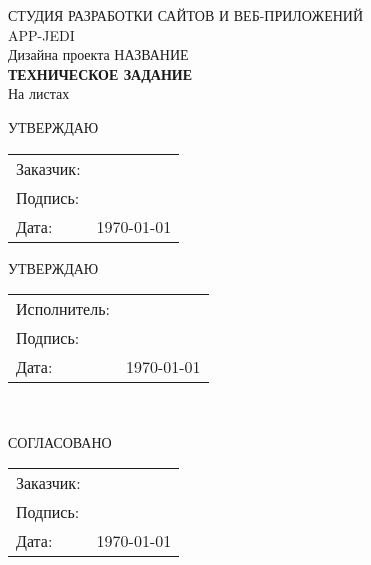 %
\begin{center}
{\Large {{СТУДИЯ РАЗРАБОТКИ САЙТОВ И ВЕБ-ПРИЛОЖЕНИЙ \\ {\LARGE APP-JEDI}}}}\\[4cm]

{\huge Дизайна проекта {\LARGE НАЗВАНИЕ}} \\[0.5cm]
{ \Huge \bf ТЕХНИЧЕСКОЕ ЗАДАНИЕ}\\[0.5cm]
На \pageref{LastPage} листах\\[3.5cm]

\begin{minipage}{\textwidth}
  \begin{minipage}{0.5\textwidth}

    \begin{flushleft}
      \begin{center}
        {\large УТВЕРЖДАЮ}\\
      \end{center}
      \begin{tabular}{ll}
        Заказчик: & \\
        Подпись: & \\
        Дата: & \today
      \end{tabular}
    \end{flushleft}
  \end{minipage}
  \begin{minipage}{0.5\textwidth}
    \begin{flushleft}
      \begin{center}
        {\large УТВЕРЖДАЮ}\\
      \end{center}
      \begin{tabular}{ll}
        Исполнитель: & \\
        Подпись: & \\
        Дата: & \today
      \end{tabular}
    \end{flushleft}
  \end{minipage}
\end{minipage}
\\[5cm]

\begin{flushleft}
\begin{minipage}{0.5\textwidth}
\begin{center}
  СОГЛАСОВАНО
\end{center}
\begin{tabular}{ll}
  Заказчик: & \texttt{}\\
  Подпись: & \\
  Дата: & \today
\end{tabular}
\end{minipage}
\end{flushleft}
\end{center}
\thispagestyle{empty}
